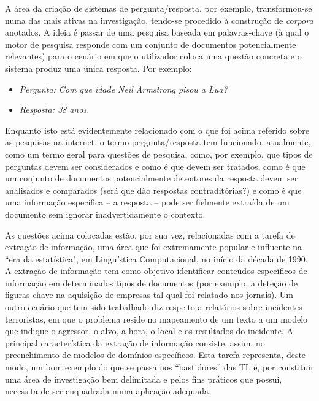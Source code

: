 \begin{multicols}{2}

A área da criação de sistemas de pergunta/resposta, por exemplo, transformou-se numa das mais ativas na investigação, tendo-se procedido à construção de \textit{corpora} anotados. A ideia é passar de uma pesquisa baseada em palavras-chave (à qual o motor de pesquisa responde com um conjunto de do\-cu\-men\-tos potencialmente relevantes) para o cenário em que o utilizador coloca uma questão concreta e o sistema produz uma única resposta. Por exemplo: 

\begin{itemize}
  \item[] \textit{Pergunta: Com que idade Neil Armstrong pisou a Lua?}
  \item[] \textit{Resposta: 38 anos.}
\end{itemize}

Enquanto isto está evidentemente relacionado com o que foi acima referido sobre as pesquisas na internet, o termo pergunta/resposta tem funcionado, atualmente, como um termo geral para questões de pesquisa, como, por exemplo, que tipos de perguntas devem ser considerados e como é que devem ser tratados, como é que um conjunto de documentos potencialmente detentores da resposta devem ser analisados e comparados (será que dão respostas contraditórias?) e como é que uma informação específica – a resposta – pode ser fielmente extraída de um documento sem ignorar inadvertidamente o contexto.

As questões acima colocadas estão, por sua vez, relacionadas com a tarefa de extração de informação, uma área que foi extremamente popular e influente na “era da estatística", em Linguística Computacional, no início da década de 1990. A extração de informação tem como objetivo identificar conteúdos específicos de informação em determinados tipos de documentos (por exemplo, a deteção de figuras-chave na aquisição de empresas tal qual foi relatado nos jornais). Um outro cenário que tem sido trabalhado diz respeito a relatórios sobre incidentes terroristas, em que o problema reside no mapeamento de um texto a um modelo que indique o agressor, o alvo, a hora, o local e os resultados do incidente. A principal característica da extração de informação consiste, assim, no preenchimento de modelos de domínios específicos. Esta tarefa representa, deste modo, um bom exemplo do que se passa nos “bastidores” das TL e, por constituir uma área de investigação bem delimitada e pelos fins práticos que possui, necessita de ser enquadrada numa aplicação adequada.


\end{multicols}
